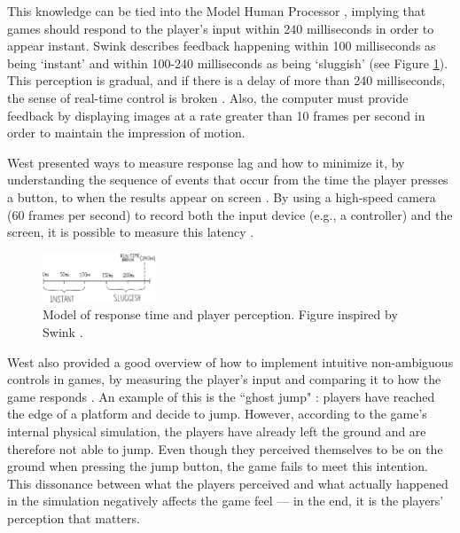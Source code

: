 This knowledge can be tied into the Model Human Processor \cite{card1986model, swink}, implying that games should respond to the player's input within 240 milliseconds in order to appear instant. Swink describes feedback happening within 100 milliseconds as being `instant' and within 100-240 milliseconds as being `sluggish' (see Figure \ref{fig:response}). This perception is gradual, and if there is a delay of more than 240 milliseconds, the sense of real-time control is broken \cite{swink}. Also, the computer must provide feedback by displaying images at a rate greater than 10 frames per second in order to maintain the impression of motion.

West presented ways to measure response lag and how to minimize it, by understanding the sequence of events that occur from the time the player presses a button, to when the results appear on screen \cite{measure_lag, program_lag}. By using a high-speed camera (60 frames per second) to record both the input device (e.g., a controller) and the screen, it is possible to measure this latency \cite{euro}.

\begin{figure}[htbp]
\centering
\includegraphics[width=0.30\textwidth]{Pics/response}
\caption{Model of response time and player perception. Figure inspired by Swink \cite{swink}.}
\label{fig:response}
\end{figure}

West also provided a good overview of how to implement intuitive non-ambiguous controls in games, by measuring the player's input and comparing it to how the game responds \cite{intuitive_buttons}. An example of this is the ``ghost jump" \cite{ghostJump, canabalt}: players have reached the edge of a platform and decide to jump. However, according to the game's internal physical simulation, the players have already left the ground and are therefore not able to jump. Even though they perceived themselves to be on the ground when pressing the jump button, the game fails to meet this intention. This dissonance between what the players perceived and what actually happened in the simulation negatively affects the game feel --- in the end, it is the players' perception that matters.

